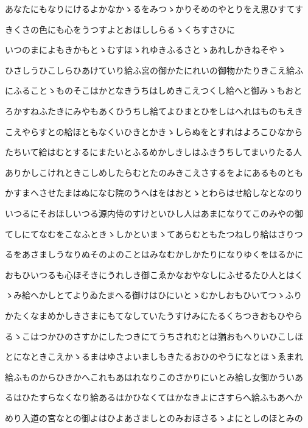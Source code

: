 \documentclass[a4paper,11pt,landscape]{ltjtarticle}
\begin{document}
\par\medskip
あなたにもなりにけるよかなかゝるをみつゝかりそめのやとりをえ思ひすてす
\par\medskip
きくさの色にも心をうつすよとおほししらるゝくちすさひに
\par\medskip
いつのまによもきかもとゝむすほゝれゆきふるさとゝあれしかきねそやゝ
\par\medskip
ひさしうひこしらひあけていり給ふ宮の御かたにれいの御物かたりきこえ給ふ
\par\medskip
にふることゝものそこはかとなきうちはしめきこえつくし給へと御みゝもおと
\par\medskip
ろかすねふたきにみやもあくひうちし給てよひまとひをしはへれはものもえき
\par\medskip
こえやらすとの給ほともなくいひきとかきゝしらぬをとすれはよろこひなから
\par\medskip
たちいて給はむとするにまたいとふるめかしきしはふきうちしてまいりたる人
\par\medskip
ありかしこけれときこしめしたらむとたのみきこえさするをよにあるものとも
\par\medskip
かすまへさせたまはぬになむ院のうへはをはおとゝとわらはせ給しなとなのり
\par\medskip
いつるにそおほしいつる源内侍のすけといひし人はあまになりてこのみやの御
\par\medskip
てしにてなむをこなふときゝしかといまゝてあらむともたつねしり給はさりつ
\par\medskip
るをあさましうなりぬそのよのことはみなむかしかたりになりゆくをはるかに
\par\medskip
おもひいつるも心ほそきにうれしき御こゑかなおやなしにふせるたひ人とはく
\par\medskip
ゝみ給へかしとてよりゐたまへる御けはひにいとゝむかしおもひいてつゝふり
\par\medskip
かたくなまめかしきさまにもてなしていたうすけみにたるくちつきおもひやら
\par\medskip
るゝこはつかひのさすかにしたつきにてうちされむとは猶おもへりいひこしほ
\par\medskip
とになときこえかゝるまはゆさよいましもきたるおひのやうになとほゝゑまれ
\par\medskip
給ふものからひきかへこれもあはれなりこのさかりにいとみ給し女御かういあ
\par\medskip
るはひたすらなくなり給あるはかひなくてはかなきよにさすらへ給ふもあへか
\par\medskip
めり入道の宮なとの御よはひよあさましとのみおほさるゝよにとしのほとみの
\par\medskip
\end{document}
